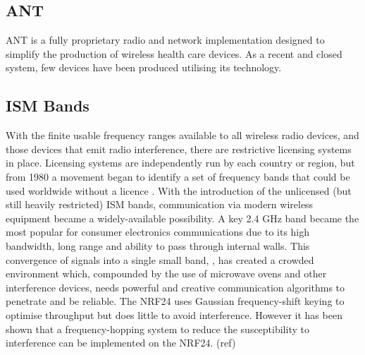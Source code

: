 \subsection{ANT}
ANT is a fully proprietary radio and network implementation designed to simplify the production of
wireless health care devices. As a recent and closed system, few devices have been produced
utilising its technology.


\subsection{\acf{ISM} Bands}
With the finite usable frequency ranges available to all wireless radio devices, and those devices that
emit radio interference, there are restrictive licensing systems in place. Licensing systems are
independently run by each country or region, but from 1980 a movement began to identify a set of
frequency bands that could be used worldwide without a licence \cite{ISMGen}.
With the introduction of the unlicensed (but still heavily restricted) \ac{ISM} bands,
communication via modern wireless equipment became a
widely-available possibility. A key 2.4 GHz band became the most popular for consumer electronics
communications due to its high bandwidth, long range and ability to pass through internal walls. This
convergence of signals into a single small band, , has created a crowded environment which,
compounded by the use of microwave ovens and other interference devices, needs powerful and
creative communication algorithms to penetrate and be reliable. The NRF24 uses Gaussian
frequency-shift keying to optimise throughput but does little to avoid interference. However it has
been shown that a frequency-hopping system to reduce the susceptibility to interference can be
implemented on the NRF24. (ref)


